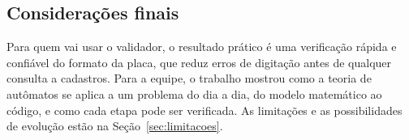 \subsection{Considerações finais}

Para quem vai usar o validador, o resultado prático é uma
verificação rápida e confiável do formato da placa, que reduz
erros de digitação antes de qualquer consulta a cadastros. Para a
equipe, o trabalho mostrou como a teoria de autômatos se aplica a
um problema do dia a dia, do modelo matemático ao código, e como
cada etapa pode ser verificada. As limitações e as possibilidades
de evolução estão na Seção~\ref{sec:limitacoes}.